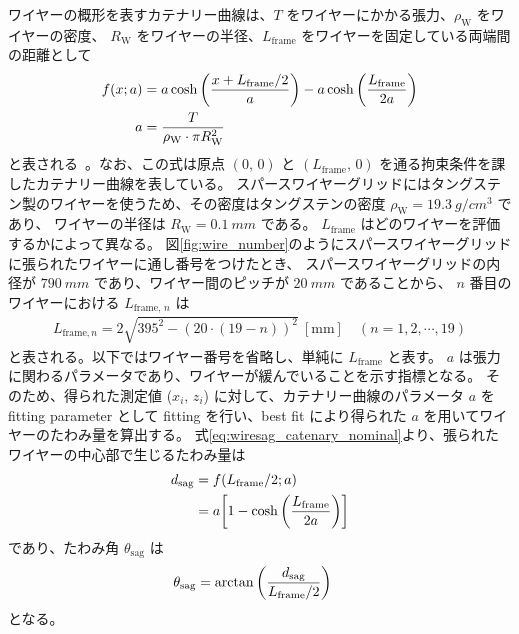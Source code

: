 \documentclass[../../main.tex]{subfiles}
\begin{document}
ワイヤーの概形を表すカテナリー曲線は、$T$ をワイヤーにかかる張力、$\rho_{\mathrm{W}}$ をワイヤーの密度、
$R_{\mathrm{W}}$ をワイヤーの半径、$L_{\mathrm{frame}}$ をワイヤーを固定している両端間の距離として
\begin{align}
    \label{eq:wiresag_catenary_nominal}
    f(x;a) &= a\cosh\qty(\dfrac{x+L_{\mathrm{frame}}/2}{a}) - a\cosh\qty(\dfrac{L_{\mathrm{frame}}}{2a}) \\
    a &= \dfrac{T}{\rho_{\mathrm{W}}\cdot\pi R_{\mathrm{W}}^2}
\end{align}
と表される~\cite{swg:murata}。なお、この式は原点 $(0,\,0)$ と $(L_{\mathrm{frame}},\,0)$ を通る拘束条件を課したカテナリー曲線を表している。
スパースワイヤーグリッドにはタングステン製のワイヤーを使うため、その密度はタングステンの密度 $\rho_{\mathrm{W}}=\SI{19.3}{g/cm^3}$ であり、
ワイヤーの半径は $R_{\mathrm{W}}=\SI{0.1}{mm}$ である。
$L_{\mathrm{frame}}$ はどのワイヤーを評価するかによって異なる。
図\ref{fig:wire_number}のようにスパースワイヤーグリッドに張られたワイヤーに通し番号をつけたとき、
スパースワイヤーグリッドの内径が $\SI{790}{mm}$ であり、ワイヤー間のピッチが $\SI{20}{mm}$ であることから、
$n$ 番目のワイヤーにおける $L_{\mathrm{frame},\,n}$ は
\begin{align}
    \label{eq:wiresag_frame_length}
    L_{\mathrm{frame}, n} = 2\sqrt{395^2-(20\cdot(19-n))^2}\ [\mathrm{mm}] \quad (n=1,2,\cdots,19)
\end{align}
と表される。以下ではワイヤー番号を省略し、単純に $L_{\mathrm{frame}}$ と表す。
$a$ は張力に関わるパラメータであり、ワイヤーが緩んでいることを示す指標となる。
そのため、得られた測定値 ($x_{i},\,z_{i}$) に対して、カテナリー曲線のパラメータ $a$ を fitting parameter として
fitting を行い、best fit により得られた $a$ を用いてワイヤーのたわみ量を算出する。
式\eqref{eq:wiresag_catenary_nominal}より、張られたワイヤーの中心部で生じるたわみ量は
\begin{align}
    d_{\mathrm{sag}} &= f(L_{\mathrm{frame}}/2;a) \\
    \label{eq:wiresag_sag}
                     &= a\qty[1-\cosh\qty(\dfrac{L_{\mathrm{frame}}}{2a})]
\end{align}
であり、たわみ角 $\theta_{\mathrm{sag}}$ は
\begin{align}
    \label{eq:wiresag_sag_angle}
    \theta_{\mathrm{sag}} &= \arctan\qty(\dfrac{d_{\mathrm{sag}}}{L_{\mathrm{frame}}/2})
\end{align}
となる。
\end{document}
